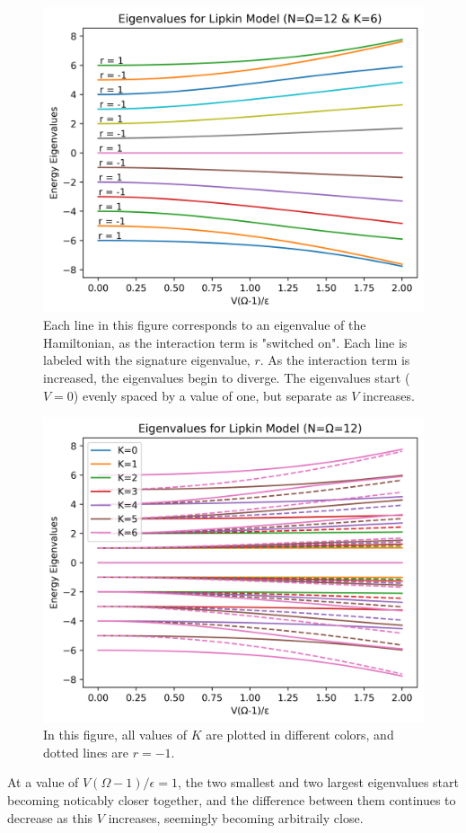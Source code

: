 \documentclass[
a4paper,
10pt,
twoside,
]{article}
\begin{document}
\begin{figure}[H]
	\centering
	\includegraphics[width=0.8\linewidth]{figures/eigenvaluePlotK6.png}
	\caption{
		Each line in this figure corresponds to an eigenvalue of the Hamiltonian, as the interaction term is "switched on".
		Each line is labeled with the signature eigenvalue, $r$.
		As the interaction term is increased, the eigenvalues begin to diverge.
		The eigenvalues start ($V=0$) evenly spaced by a value of one, but separate as $V$ increases.
	}
	\label{fig: eigenvalues K6}
\end{figure}
\begin{figure}[H]
	\centering
	\includegraphics[width=0.8\linewidth]{figures/eigenvaluePlotAllK.png}
	\caption{
		In this figure, all values of $K$ are plotted in different colors, and dotted lines are $r=-1$.
	}
	\label{fig: eigenvalues all K}
\end{figure}

At a value of $V(\Omega-1)/\epsilon = 1$, the two smallest and two largest eigenvalues start becoming noticably closer together, and the difference between them continues to decrease as this $V$ increases, seemingly becoming arbitraily close.
\end{document}
